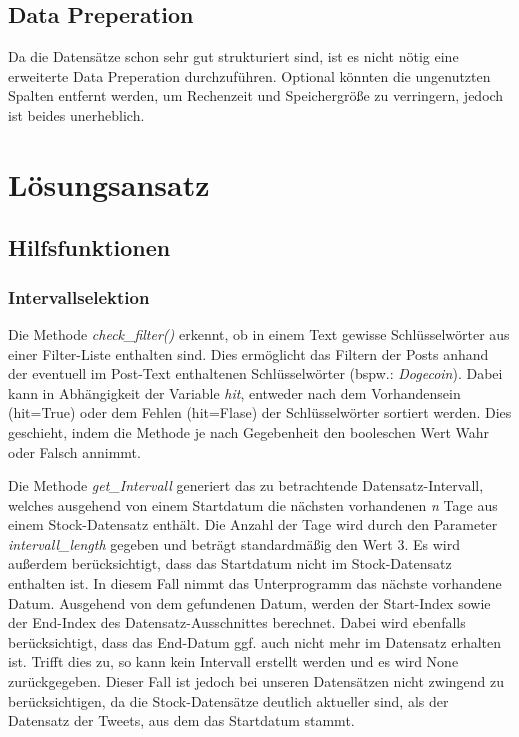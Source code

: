 \documentclass{article}
\begin{document}
\subsection{Data Preperation} \label{Data Preperation}
Da die Datensätze schon sehr gut strukturiert sind, ist es nicht nötig eine erweiterte Data Preperation durchzuführen.
Optional könnten die ungenutzten Spalten entfernt werden, um Rechenzeit und Speichergröße zu verringern, jedoch ist beides unerheblich.



\section{Lösungsansatz} \label{Lösungsansatz} 


\subsection{Hilfsfunktionen} \label{Hilfsfunktionen}

\subsubsection{Intervallselektion} \label{Intervallselektion}
Die Methode \textit{check\_filter()} erkennt, ob in einem Text gewisse Schlüsselwörter aus einer Filter-Liste enthalten sind.
Dies ermöglicht das Filtern der Posts anhand der eventuell im Post-Text enthaltenen Schlüsselwörter (bspw.: \textit{Dogecoin}).
Dabei kann in Abhängigkeit der Variable \textit{hit}, entweder nach dem Vorhandensein (hit=True) oder dem Fehlen (hit=Flase) der Schlüsselwörter sortiert werden.
Dies geschieht, indem die Methode je nach Gegebenheit den booleschen Wert Wahr oder Falsch annimmt.
\par
Die Methode \textit{get\_Intervall} generiert das zu betrachtende Datensatz-Intervall, welches ausgehend von einem Startdatum die nächsten vorhandenen \textit{n} Tage aus einem Stock-Datensatz enthält.
Die Anzahl der Tage wird durch den Parameter \textit{intervall\_length} gegeben und beträgt standardmäßig den Wert 3.
Es wird außerdem berücksichtigt, dass das Startdatum nicht im Stock-Datensatz enthalten ist.
In diesem Fall nimmt das Unterprogramm das nächste vorhandene Datum.
Ausgehend von dem gefundenen Datum, werden der Start-Index sowie der End-Index des Datensatz-Ausschnittes berechnet.
Dabei wird ebenfalls berücksichtigt, dass das End-Datum ggf. auch nicht mehr im Datensatz erhalten ist. Trifft dies zu, so kann kein Intervall erstellt werden und es wird None zurückgegeben.
Dieser Fall ist jedoch bei unseren Datensätzen nicht zwingend zu berücksichtigen, da die Stock-Datensätze deutlich aktueller sind, als der Datensatz der Tweets, aus dem das Startdatum stammt.
\end{document}
